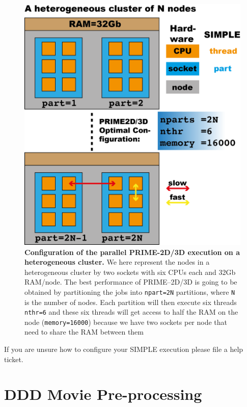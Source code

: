 \documentclass[a4paper,11pt]{article}
\begin{document}
\begin{figure}
\includegraphics[keepaspectratio=true,scale=0.6]{./CPUtopo/cputopo}
\caption{\textbf{Configuration of the parallel PRIME-2D/3D execution on a heterogeneous cluster.} We here represent the nodes in  a heterogeneous cluster by two sockets with six CPUs each and 32Gb RAM/node. The best performance of PRIME--2D/3D is going to be obtained by partitioning  the jobs into \texttt{npart=2N} partitions, where \texttt{N} is the number of nodes. Each partition will then execute six threads \texttt{nthr=6} and these six threads will get access to half the RAM on the node (\texttt{memory=16000}) because we have two sockets per node that need to share the RAM between them}
\end{figure}
If you are unsure how to configure your SIMPLE execution please file a help ticket.

\section{DDD Movie Pre-processing}
\end{document}
